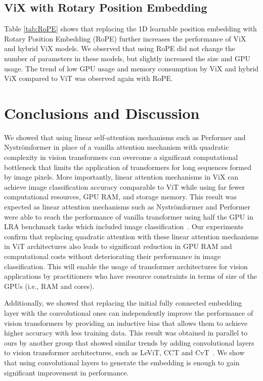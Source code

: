 \documentclass{article}
\begin{document}
\subsection{ViX with Rotary Position Embedding}

Table \ref{tab:RoPE} shows that replacing the 1D learnable position embedding with Rotary Position Embedding (RoPE) further increases the performance of ViX and hybrid ViX models. We observed that using RoPE did not change the number of parameters in these models, but slightly increased the size and GPU usage. The trend of low GPU usage and memory consumption by ViX and hybrid ViX compared to ViT was observed again with RoPE. 



\section{Conclusions and Discussion}

We showed that using linear self-attention mechanisms such as Performer and Nyströmformer in place of a vanilla attention mechanism with quadratic complexity in vision transformers can overcome a significant computational bottleneck that limits the application of transformers for long sequences formed by image pixels. More importantly, linear attention mechanisms in ViX can achieve image classification accuracy comparable to ViT while using far fewer computational resources, GPU RAM, and storage memory. This result was expected as linear attention mechanisms such as Nyströmformer and Performer were able to reach the performance of vanilla transformer using half the GPU in LRA benchmark tasks which included image classification~\cite{tay2020long,xiong2021nystromformer}. Our experiments confirm that replacing quadratic attention with these linear attention mechanisms in ViT architectures also leads to significant reduction in GPU RAM and computational costs without deteriorating their performance in image classification. This will enable the usage of transformer architectures for vision applications by practitioners who have resource constraints in terms of size of the GPUs (i.e., RAM and cores).

Additionally, we showed that replacing the initial fully connected embedding layer with the convolutional ones can independently improve the performance of vision transformers by providing an inductive bias that allows them to achieve higher accuracy with less training data. This result was obtained in parallel to ours by another group that showed similar trends by adding convolutional layers to vision transformer architectures, such as LeViT, CCT and CvT~\cite{graham2021levit,wu2021cvt,hassani2021escaping,heo2021rethinking}. We show that using convolutional layers to generate the embedding is enough to gain significant improvement in performance.
\end{document}
